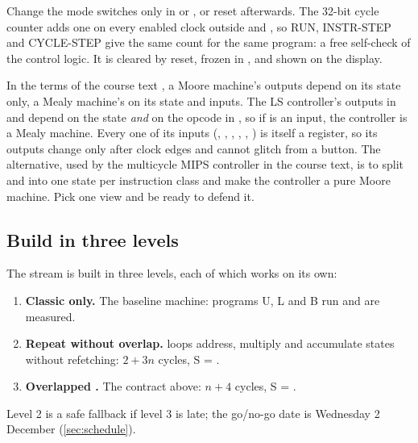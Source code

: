 Change the mode switches only in  or , or reset afterwards. The 32-bit cycle counter adds one on every enabled clock outside  and , so RUN, INSTR-STEP and CYCLE-STEP give the same count for the same program: a free self-check of the control logic. It is cleared by reset, frozen in , and shown on the display.

\begin{aside}
In the terms of the course text \citep{harris2013ddca}, a Moore machine's outputs depend on its state only, a Mealy machine's on its state and inputs. The LS controller's outputs in  and  depend on the state \emph{and} on the opcode in , so if  is an input, the controller is a Mealy machine. Every one of its inputs (, , , , , ) is itself a register, so its outputs change only after clock edges and cannot glitch from a button. The alternative, used by the multicycle MIPS controller in the course text, is to split  and  into one state per instruction class and make the controller a pure Moore machine. Pick one view and be ready to defend it.
\end{aside}

\subsection{Build in three levels}

The stream is built in three levels, each of which works on its own:
\begin{enumerate}[label=\textbf{\arabic*.},leftmargin=1.6em]
\item \textbf{Classic  only.} The baseline machine: programs U, L and B run and are measured.
\item \textbf{Repeat without overlap.}  loops address, multiply and accumulate states without refetching: $2+3n$ cycles, S = \pred{\cycNoOverlap}.
\item \textbf{Overlapped .} The contract above: $n+4$ cycles, S = \pred{\cycS}.
\end{enumerate}
Level 2 is a safe fallback if level 3 is late; the go/no-go date is Wednesday 2 December (\cref{sec:schedule}).
